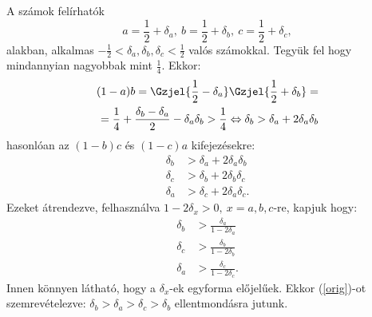 
A számok felírhatók
$$
a=\frac{1}{2}+\delta_{a},\ b=\frac{1}{2}+\delta_{b},\ c=\frac{1}{2}+\delta_{c},
$$
alakban, alkalmas $-\frac{1}{2}<\delta_{a},\delta_{b},\delta_{c}<\frac{1}{2}$ 
valós számokkal. Tegyük fel hogy mindannyian nagyobbak mint $\frac{1}{4}.$
Ekkor:
\begin{align*}
(1-a)b=\Gzjel{\frac{1}{2}-\delta_{a}}\Gzjel{\frac{1}{2}+\delta_{b}}=\\ 
= \frac{1}{4}+\frac{\delta_{b}-\delta_{a}}{2}-\delta_{a}\delta_{b}>\frac{1}{4} 
\Leftrightarrow \delta_{b} > \delta_{a} + 2\delta_{a}\delta_{b}
\end{align*}
hasonlóan az $(1-b)c$ és $(1-c)a$ kifejezésekre:
\begin{equation}
\label{orig}
\tag{orig}
\begin{split}
\delta_{b} &> \delta_{a} + 2\delta_{a}\delta_{b} \\
\delta_{c} &> \delta_{b} + 2\delta_{b}\delta_{c} \\
\delta_{a} &> \delta_{c} + 2\delta_{a}\delta_{c}.
\end{split}
\end{equation}
Ezeket átrendezve, felhasználva $1-2\delta_{x}>0, \ x=a,b,c$-re, kapjuk hogy:
\begin{align*}
\delta_{b} &> \frac{\delta_{a}}{1 - 2\delta_{a}} \\
\delta_{c} &> \frac{\delta_{b}}{1 - 2\delta_{b}} \\
\delta_{a} &> \frac{\delta_{c}}{1 - 2\delta_{c}}.
\end{align*}
Innen könnyen látható, hogy a $\delta_{x}$-ek egyforma előjelűek. Ekkor (\ref{orig})-ot 
szemrevételezve: $\delta_{b}>\delta_{a}>\delta_{c}>\delta_{b}$ ellentmondásra jutunk.
